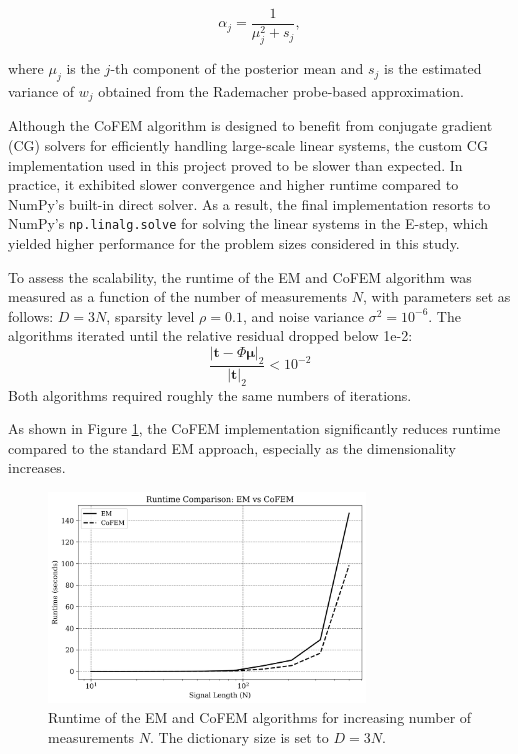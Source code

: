 \documentclass{article}
\begin{document}
\begin{equation}
    \alpha_j = \frac{1}{\mu_j^2 + s_j},
\end{equation}

where $ \mu_j $ is the $ j $-th component of the posterior mean and $ s_j $ is the estimated variance of $ w_j $ obtained from the Rademacher probe-based approximation.

Although the CoFEM algorithm is designed to benefit from conjugate gradient (CG) solvers for efficiently handling large-scale linear systems, the custom CG implementation used in this project proved to be slower than expected. In practice, it exhibited slower convergence and higher runtime compared to NumPy’s built-in direct solver. As a result, the final implementation resorts to NumPy’s \texttt{np.linalg.solve} for solving the linear systems in the E-step, which yielded higher performance for the problem sizes considered in this study.

To assess the scalability, the runtime of the EM and CoFEM algorithm was measured as a function of the number of measurements $ N $, with parameters set as follows:  $ D = 3N $, sparsity level $ \rho = 0.1 $, and noise variance $ \sigma^2 = 10^{-6} $. The algorithms iterated until the relative residual dropped below 1e-2:
\begin{equation}
\frac{|\mathbf{t} - \Phi \boldsymbol{\mu}|_2}{|\mathbf{t}|_2} < 10^{-2}
\end{equation}
Both algorithms required roughly the same numbers of iterations.

As shown in Figure \ref{fig:runtime_comparison}, the CoFEM implementation significantly reduces runtime compared to the standard EM approach, especially as the dimensionality increases.

\begin{figure}[H]
    \centering
    \includegraphics[width=0.75\textwidth]{Figures/runtime_comp.png}
    \caption{Runtime of the EM and CoFEM algorithms for increasing number of measurements $ N $. The dictionary size is set to $ D = 3N $.}
    \label{fig:runtime_comparison}
\end{figure}
\end{document}
